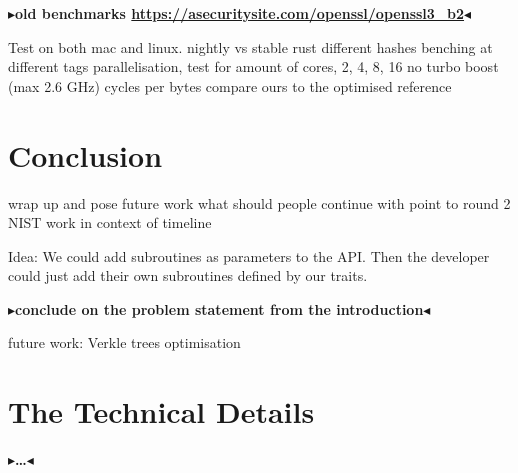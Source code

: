 \documentclass[twoside,11pt]{report}
\theoremstyle{definition}
\theoremstyle{plain}
\newcommand{\todo}[1]{{\color[rgb]{.5,0,0}\textbf{$\blacktriangleright$#1$\blacktriangleleft$}}}
\begin{document}
\todo{old benchmarks \url{https://asecuritysite.com/openssl/openssl3_b2}}

Test on both mac and linux.
nightly vs stable rust
different hashes
benching at different tags
parallelisation, test for amount of cores, 2, 4, 8, 16
no turbo boost (max 2.6 GHz)
cycles per bytes
compare ours to the optimised reference


\chapter{Conclusion}\label{ch:conclusion}

wrap up and pose future work
what should people continue with
point to round 2 NIST
work in context of timeline

Idea: We could add subroutines as parameters to the API. Then the developer could just add their own subroutines defined by our traits.

\todo{conclude on the problem statement from the introduction}

future work: Verkle trees optimisation


\cleardoublepage
{}




\cleardoublepage
\appendix
\chapter{The Technical Details}

\todo{\dots}
\end{document}

